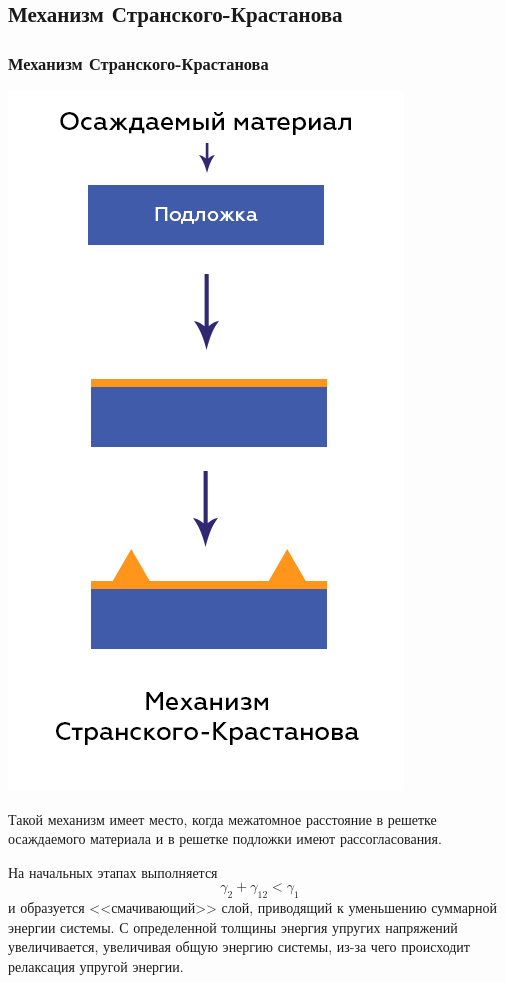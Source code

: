 \documentclass[10pt,pdf,hyperref={unicode}, dvipsnames]{beamer}
\begin{document}
\subsection{Механизм Странского-Крастанова}
\begin{frame}[t]
	\frametitle{Механизм Странского-Крастанова}
	\begin{minipage}{0.4\linewidth}
		\includegraphics[width = \linewidth]{imgs/SKM.png}
	\end{minipage}	
	\begin{minipage}{0.59\linewidth}
		Такой механизм имеет место, когда межатомное расстояние в решетке осаждаемого материала и в решетке подложки
		имеют рассогласования.

		На начальных этапах выполняется $$ \gamma_2+\gamma_{12}<\gamma_1 $$ и образуется <<смачивающий>>   слой, приводящий к уменьшению суммарной энергии системы. С определенной
		толщины энергия упругих напряжений увеличивается, увеличивая общую энергию системы, из-за чего происходит релаксация упругой энергии.
	\end{minipage}
\end{frame}
\end{document}
